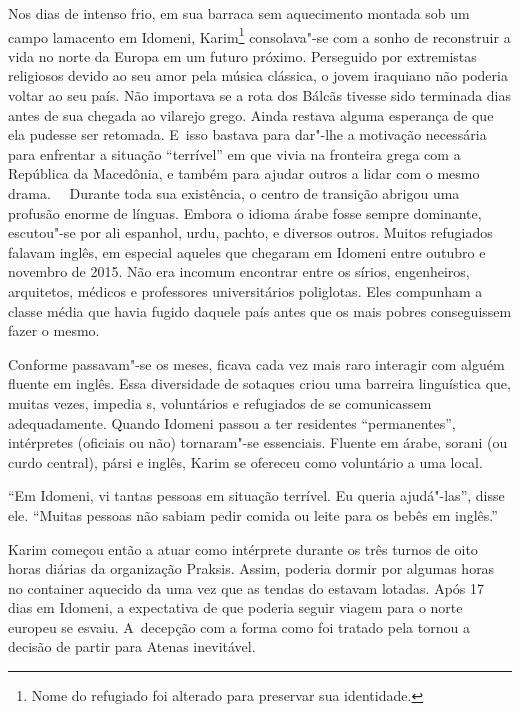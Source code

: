 

Nos dias de intenso frio, em sua barraca sem aquecimento montada sob um
campo lamacento em Idomeni, Karim\footnote{ Nome do refugiado foi alterado para preservar sua
identidade.}  consolava"-se com a
sonho de reconstruir a vida no norte da Europa em um futuro próximo.
Perseguido por extremistas religiosos devido ao seu amor pela música
clássica, o jovem iraquiano não poderia voltar ao seu país. Não
importava se a rota dos Bálcãs tivesse sido terminada dias antes de sua
chegada ao vilarejo grego. Ainda restava alguma esperança de que ela
pudesse ser retomada. E~isso bastava para dar"-lhe a motivação necessária
para enfrentar a situação ``terrível'' em que vivia na fronteira grega
com a República da Macedônia, e também para ajudar outros a lidar com o
mesmo drama.
\ \
Durante toda sua existência, o centro de transição abrigou uma
profusão enorme de línguas. Embora o idioma árabe fosse sempre
dominante, escutou"-se por ali espanhol, urdu, pachto, e diversos outros.
Muitos refugiados falavam inglês, em especial aqueles que chegaram em
Idomeni entre outubro e novembro de 2015. Não era incomum encontrar
entre os sírios, engenheiros, arquitetos, médicos e professores
universitários poliglotas. Eles compunham a classe média que havia
fugido daquele país antes que os mais pobres conseguissem fazer o mesmo.

Conforme passavam"-se os meses, ficava cada vez mais raro interagir com
alguém fluente em inglês. Essa diversidade de sotaques criou uma
barreira linguística que, muitas vezes, impedia \versal{ONG}s, voluntários e
refugiados de se comunicassem adequadamente. Quando Idomeni passou a ter
residentes ``permanentes'', intérpretes (oficiais ou não) tornaram"-se
essenciais. Fluente em árabe, sorani (ou curdo central), pársi e inglês,
Karim se ofereceu como voluntário a uma \versal{ONG} local.

``Em Idomeni, vi tantas pessoas em situação terrível. Eu queria
ajudá"-las'', disse ele. ``Muitas pessoas não sabiam pedir comida ou
leite para os bebês em inglês.''

Karim começou então a atuar como intérprete durante os três turnos de
oito horas diárias da organização Praksis. Assim, poderia dormir por
algumas horas no container aquecido da \versal{ONG} uma vez que as tendas do 
estavam lotadas. Após 17 dias em Idomeni, a expectativa de que poderia
seguir viagem para o norte europeu se esvaiu. A~decepção com a forma
como foi tratado pela \versal{ONG} tornou a decisão de partir para Atenas
inevitável.

